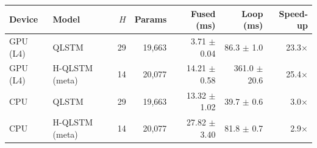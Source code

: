 \begin{tabular}{llrrrrr}
\toprule
Device & Model & $H$ & Params & Fused (ms) & Loop (ms) & Speed-up \\
\midrule
GPU (L4) & QLSTM & 29 & 19,663 & 3.71 $\pm$ 0.04 & 86.3 $\pm$ 1.0 & 23.3$\times$ \\
GPU (L4) & H-QLSTM (meta) & 14 & 20,077 & 14.21 $\pm$ 0.58 & 361.0 $\pm$ 20.6 & 25.4$\times$ \\
CPU & QLSTM & 29 & 19,663 & 13.32 $\pm$ 1.02 & 39.7 $\pm$ 0.6 & 3.0$\times$ \\
CPU & H-QLSTM (meta) & 14 & 20,077 & 27.82 $\pm$ 3.40 & 81.8 $\pm$ 0.7 & 2.9$\times$ \\
\bottomrule
\end{tabular}
